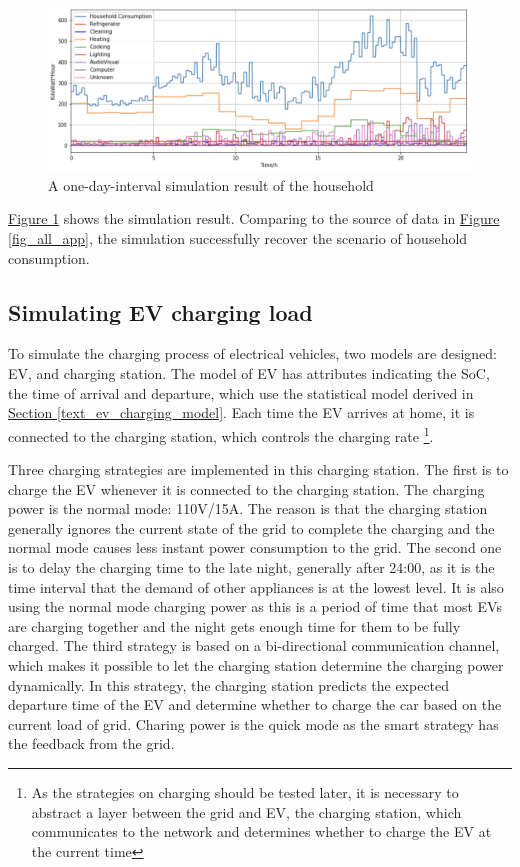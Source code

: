 \documentclass[12pt,a4paper]{report}
\begin{document}
                \begin{figure}[ht]
                    \centerline{\includegraphics[scale=1]{simu_household}}
                    \caption{A one-day-interval simulation result of the household}
                    \label{fig_simu_household}
                \end{figure}

                \hyperref[fig_simu_household]{Figure \ref*{fig_simu_household}} shows the simulation result. Comparing to the source of data in \hyperref[fig_all_app]{Figure \ref*{fig_all_app}}, the simulation successfully recover the scenario of household consumption.
                \subsection{Simulating EV charging load}
                To simulate the charging process of electrical vehicles, two models are designed: EV, and charging station. The model of EV has attributes indicating the SoC, the time of arrival and departure, which use the statistical model derived in \hyperref[text_ev_charging_model]{Section \ref*{text_ev_charging_model}}. Each time the EV arrives at home, it is connected to the charging station, which controls the charging rate \footnote{As the strategies on charging should be tested later, it is necessary to abstract a layer between the grid and EV, the charging station, which communicates to the network and determines whether to charge the EV at the current time}.

                Three charging strategies are implemented in this charging station. The first is to charge the EV whenever it is connected to the charging station. The charging power is the normal mode: 110V/15A. The reason is that the charging station generally ignores the current state of the grid to complete the charging and the normal mode causes less instant power consumption to the grid. The second one is to delay the charging time to the late night, generally after 24:00, as it is the time interval that the demand of other appliances is at the lowest level. It is also using the normal mode charging power as this is a period of time that most EVs are charging together and the night gets enough time for them to be fully charged. The third strategy is based on a bi-directional communication channel, which makes it possible to let the charging station determine the charging power dynamically. In this strategy, the charging station predicts the expected departure time of the EV and determine whether to charge the car based on the current load of grid. Charing power is the quick mode as the smart strategy has the feedback from the grid.
\end{document}
